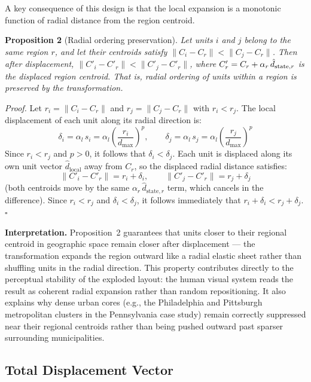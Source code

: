 \documentclass[12pt, a4paper]{article}
\numberwithin{equation}{section}
\begin{document}
A key consequence of this design is that the local expansion is a monotonic function of radial distance from the region centroid.

\begin{mdframed}[linecolor=blue!50!black, linewidth=1pt, topline=true, bottomline=true, rightline=false, leftline=false, innertopmargin=6pt, innerbottommargin=6pt]
\textbf{Proposition 2} (Radial ordering preservation). \textit{Let units $i$ and $j$ belong to the same region $r$, and let their centroids satisfy $\|C_i - C_r\| < \|C_j - C_r\|$. Then after displacement, $\|C'_i - C'_r\| < \|C'_j - C'_r\|$, where $C'_r = C_r + \alpha_r\,\hat{d}_{\textup{state},r}$ is the displaced region centroid. That is, radial ordering of units within a region is preserved by the transformation.}

\smallskip
\textit{Proof.} Let $r_i = \|C_i - C_r\|$ and $r_j = \|C_j - C_r\|$ with $r_i < r_j$. The local displacement of each unit along its radial direction is:
\[
  \delta_i = \alpha_l\, s_i = \alpha_l \left(\frac{r_i}{d_{\max}}\right)^p, \qquad
  \delta_j = \alpha_l\, s_j = \alpha_l \left(\frac{r_j}{d_{\max}}\right)^p
\]
Since $r_i < r_j$ and $p > 0$, it follows that $\delta_i < \delta_j$. Each unit is displaced along its own unit vector $\hat{d}_{\text{local}}$ away from $C_r$, so the displaced radial distance satisfies:
\[
  \|C'_i - C'_r\| = r_i + \delta_i, \qquad \|C'_j - C'_r\| = r_j + \delta_j
\]
(both centroids move by the same $\alpha_r\,\hat{d}_{\text{state},r}$ term, which cancels in the difference). Since $r_i < r_j$ and $\delta_i < \delta_j$, it follows immediately that $r_i + \delta_i < r_j + \delta_j$. $\square$
\end{mdframed}

\smallskip
\noindent\textbf{Interpretation.} Proposition~2 guarantees that units closer to their regional centroid in geographic space remain closer after displacement --- the transformation expands the region outward like a radial elastic sheet rather than shuffling units in the radial direction. This property contributes directly to the perceptual stability of the exploded layout: the human visual system reads the result as coherent radial expansion rather than random repositioning. It also explains why dense urban cores (e.g., the Philadelphia and Pittsburgh metropolitan clusters in the Pennsylvania case study) remain correctly suppressed near their regional centroids rather than being pushed outward past sparser surrounding municipalities.

\subsection{Total Displacement Vector}
\end{document}
